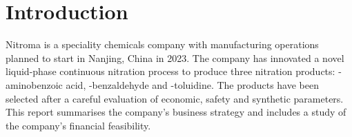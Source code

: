 \section{Introduction}
Nitroma is a speciality chemicals company with manufacturing operations planned to start in Nanjing, China in 2023. The company has innovated a novel liquid-phase continuous nitration process to produce three nitration products: \para-aminobenzoic acid, \para-benzaldehyde and \ortho-toluidine. The products have been selected after a careful evaluation of economic, safety and synthetic parameters. This report summarises the company’s business strategy and includes a study of the company’s financial feasibility. 